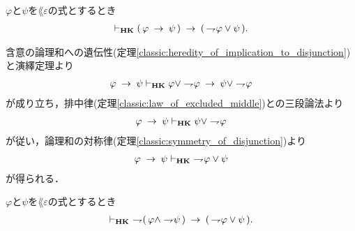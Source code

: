 	\begin{screen}
		\begin{thm}[含意は否定と論理和で表せる]
		\label{classic:implication_rewritable_by_disjunction_of_negation}
			$\varphi$と$\psi$を$\lang{\varepsilon}$の式とするとき
			\begin{align}
				\vdash_{{\scriptsize \mbox{{\bf HK}}}} (\, \varphi \hspace{0.25em}\rightarrow\hspace{0.25em} \psi\, )
				\hspace{0.25em}\rightarrow\hspace{0.25em} (\, \rightharpoondown\hspace{-0.25em} \varphi \vee \psi\, ).
			\end{align}
		\end{thm}
	\end{screen}
	
	\begin{sketch}
		含意の論理和への遺伝性(定理\ref{classic:heredity_of_implication_to_disjunction})
		と演繹定理より
		\begin{align}
			\varphi \hspace{0.25em}\rightarrow\hspace{0.25em} \psi \vdash_{{\scriptsize \mbox{{\bf HK}}}}
			\varphi \vee \rightharpoondown\hspace{-0.25em} \varphi \hspace{0.25em}\rightarrow\hspace{0.25em} \psi \vee \rightharpoondown\hspace{-0.25em} \varphi
		\end{align}
		が成り立ち，排中律(定理\ref{classic:law_of_excluded_middle})との三段論法より
		\begin{align}
			\varphi \hspace{0.25em}\rightarrow\hspace{0.25em} \psi \vdash_{{\scriptsize \mbox{{\bf HK}}}}
			\psi \vee \rightharpoondown\hspace{-0.25em} \varphi
		\end{align}
		が従い，論理和の対称律(定理\ref{classic:symmetry_of_disjunction})より
		\begin{align}
			\varphi \rarrow \psi \provable{\mbox{{\bf HK}}}\ 
			\negation \varphi \vee \psi
		\end{align}
		が得られる．
		\QED
	\end{sketch}
	
	\begin{screen}
		\begin{thm}[De Morganの法則2]
		\label{classic:De_Morgan_law_2}
			$\varphi$と$\psi$を$\lang{\varepsilon}$の式とするとき
			\begin{align}
				\provable{\mbox{{\bf HK}}}\ 
				\negation (\, \varphi \wedge \negation \psi\, )
				\rarrow (\, \negation \varphi \vee \psi\, ).
			\end{align}
		\end{thm}
	\end{screen}
	
